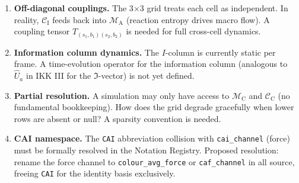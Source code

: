 \documentclass[11pt, a4paper, oneside]{article}
\theoremstyle{definition}
\theoremstyle{plain}
\theoremstyle{remark}
\newcommand{\Macro}{\mathscr{M}}          %
\newcommand{\Chem}{\mathscr{C}}           %
\newcommand{\MC}{\Macro_{\mathrm{C}}}
\newcommand{\MA}{\Macro_{\mathrm{A}}}
\newcommand{\CC}{\Chem_{\mathrm{C}}}
\newcommand{\CI}{\Chem_{\mathrm{I}}}
\newcommand{\Ifrak}{\mathfrak{I}}
\begin{document}
\begin{enumerate}
  \item \textbf{Off-diagonal couplings.}
    The 3$\times$3 grid treats each cell as independent. In reality,
    $\CI$ feeds back into $\MA$ (reaction entropy drives macro flow).
    A coupling tensor $T_{(s_1,b_1)(s_2,b_2)}$ is needed for full cross-cell dynamics.

  \item \textbf{Information column dynamics.}
    The $I$-column is currently static per frame. A time-evolution operator
    for the information column (analogous to $\hat{U}_a$ in IKK III for the
    $\Ifrak$-vector) is not yet defined.

  \item \textbf{Partial resolution.}
    A simulation may only have access to $\MC$ and $\CC$ (no fundamental
    bookkeeping). How does the grid degrade gracefully when lower rows
    are absent or null? A sparsity convention is needed.

  \item \textbf{CAI namespace.}
    The \texttt{CAI} abbreviation collision with \texttt{cai\_channel} (force)
    must be formally resolved in the Notation Registry. Proposed resolution:
    rename the force channel to \texttt{colour\_avg\_force} or \texttt{caf\_channel}
    in all source, freeing \texttt{CAI} for the identity basis exclusively.
\end{enumerate}
\end{document}
